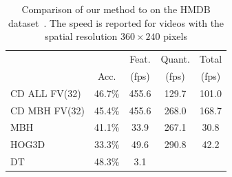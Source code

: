 \documentclass[10pt,twocolumn,letterpaper]{article}
\begin{document}
\begin{table}
\begin{center}
\begin{tabular}{|l|c|c|c|c|}
\hline
		 				&  	 		& Feat.                    & Quant. 	& Total	\\
		 				& Acc.		& (fps)                    & (fps) 	& (fps)	\\\hline
CD ALL FV(32)		& 46.7\% 	& 455.6                    & 129.7 	& 101.0	\\ %
CD MBH FV(32)		& 45.4\% 	& 455.6                    & 268.0 	& 168.7	\\ %
\hline
MBH \cite{Feng13}		& 41.1\% 	& 33.9            	     	& 267.1 & 30.8	\\ %
HOG3D \cite{Feng13}	& 33.3\% 	& 49.6            	   	& 290.8 & 42.2	\\ %
DT	\cite{Wang12}			& 48.3\%& 3.1								&			& \\ %
\hline
\end{tabular}
\smallskip
\caption{Comparison of our method to \cite{Feng13} on the HMDB dataset~\cite{Kuehne11}. The speed is reported for videos with the spatial resolution $360\times 240$ pixels}
\label{tab:hmdb_comparison}
\mbox{}\vspace{-1cm}\\
\end{center}
\end{table}



\end{document}
